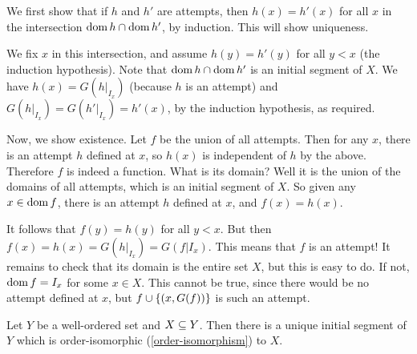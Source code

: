 \documentclass{article}
\begin{document}
\begin{prf}
    We first show that if $h$ and $h'$ are attempts, then $h(x) = h'(x)$ for all $x$ in the intersection $\operatorname{dom} h \cap \operatorname{dom} h'$, by induction. This will show uniqueness.
    
    We fix $x$ in this intersection, and assume $h(y) = h'(y)$ for all $y < x$ (the induction hypothesis). Note that $\operatorname{dom} h \cap \operatorname{dom} h'$ is an initial segment of $X$. We have $h(x) = G(h|_{I_x})$ (because $h$ is an attempt) and $G(h|_{I_x}) = G(h'|_{I_x}) = h'(x)$, by the induction hypothesis, as required.
    
    Now, we show existence. Let $f$ be the union of all attempts. Then for any $x$, there is an attempt $h$ defined at $x$, so $h(x)$ is independent of $h$ by the above. Therefore $f$ is indeed a function. What is its domain? Well it is the union of the domains of all attempts, which is an initial segment of $X$. So given any $x \in \operatorname{dom} f$, there is an attempt $h$ defined at $x$, and $f(x) = h(x)$.
    
    It follows that $f(y) = h(y)$ for all $y < x$. But then $f(x) = h(x) = G(h|_{I_x}) = G(f|{I_x})$. This means that $f$ is an attempt! It remains to check that its domain is the entire set $X$, but this is easy to do. If not, $\operatorname{dom} f = I_x$ for some $x \in X$. This cannot be true, since there would be no attempt defined at $x$, but $f \cup \left\lbrace (x, G(f)) \right\rbrace$ is such an attempt.
\end{prf}

\begin{proposition}
	\label{subset-collapse}
    Let $Y$ be a well-ordered set and $X \subseteq Y$. Then there is a unique initial segment of $Y$ which is order-isomorphic (\ref{order-isomorphism}) to $X$.
\end{proposition}
\end{document}
